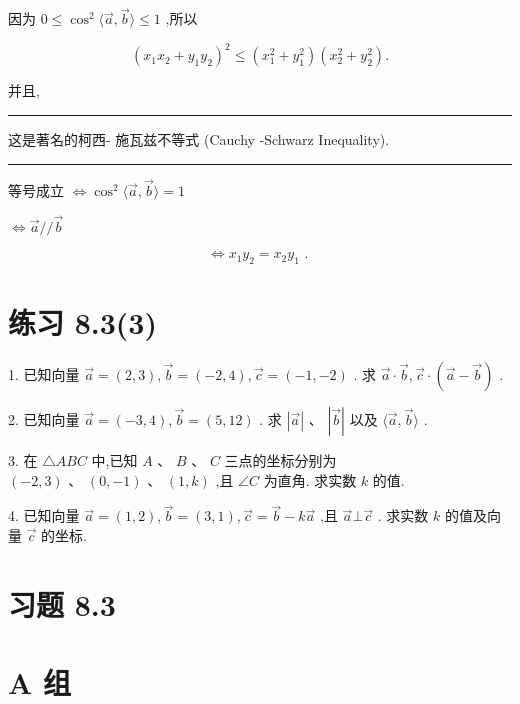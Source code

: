 \documentclass[10pt]{article}
\newcommand{\HRule}{\begin{center}\rule{0.9\linewidth}{0.2mm}\end{center}}
\begin{document}
因为 \(0 \leq  {\cos }^{2}\langle \overrightarrow{a},\overrightarrow{b}\rangle  \leq  1\) ,所以

\[
{\left( {x}_{1}{x}_{2} + {y}_{1}{y}_{2}\right) }^{2} \leq  \left( {{x}_{1}^{2} + {y}_{1}^{2}}\right) \left( {{x}_{2}^{2} + {y}_{2}^{2}}\right) .
\]

并且,

\HRule

这是著名的柯西- 施瓦兹不等式 (Cauchy -Schwarz Inequality).

\HRule

等号成立 \(\Leftrightarrow  {\cos }^{2}\langle \overrightarrow{a},\overrightarrow{b}\rangle  = 1\)

\(\Leftrightarrow  \overrightarrow{a}//\overrightarrow{b}\)

\[
\Leftrightarrow  {x}_{1}{y}_{2} = {x}_{2}{y}_{1}\text{ . }
\]

\section*{练习 8.3(3)}

1. 已知向量 \(\overrightarrow{a} = \left( {2,3}\right) ,\overrightarrow{b} = \left( {-2,4}\right) ,\overrightarrow{c} = \left( {-1, - 2}\right)\) . 求 \(\overrightarrow{a} \cdot  \overrightarrow{b},\overrightarrow{c} \cdot  \left( {\overrightarrow{a} - \overrightarrow{b}}\right)\) .

2. 已知向量 \(\overrightarrow{a} = \left( {-3,4}\right) ,\overrightarrow{b} = \left( {5,{12}}\right)\) . 求 \(\left| \overrightarrow{a}\right| \text{ 、 }\left| \overrightarrow{b}\right|\) 以及 \(\langle \overrightarrow{a},\overrightarrow{b}\rangle\) .

3. 在 \(\bigtriangleup {ABC}\) 中,已知 \(A\text{ 、 }B\text{ 、 }C\) 三点的坐标分别为 \(\left( {-2,3}\right) \text{ 、 }\left( {0, - 1}\right) \text{ 、 }\left( {1,k}\right)\) ,且 \(\angle C\) 为直角. 求实数 \(k\) 的值.

4. 已知向量 \(\overrightarrow{a} = \left( {1,2}\right) ,\overrightarrow{b} = \left( {3,1}\right) ,\overrightarrow{c} = \overrightarrow{b} - k\overrightarrow{a}\) ,且 \(\overrightarrow{a}\bot \overrightarrow{c}\) . 求实数 \(k\) 的值及向量 \(\overrightarrow{c}\) 的坐标.

\section*{习题 8.3}

\section*{A 组}
\end{document}

